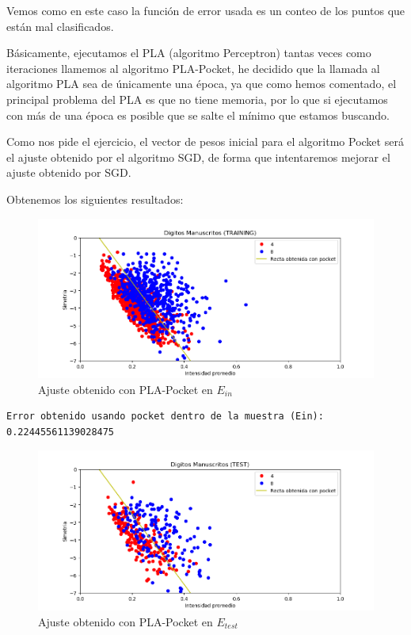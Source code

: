 \documentclass[12pt, spanish]{article}
\begin{document}
Vemos como en este caso la función de error usada es un conteo de los puntos que están mal clasificados.

Básicamente, ejecutamos el PLA (algoritmo Perceptron) tantas veces como iteraciones llamemos al algoritmo PLA-Pocket, he decidido que la llamada al algoritmo PLA sea de únicamente una época, ya que como hemos comentado, el principal problema del PLA es que no tiene memoria, por lo que si ejecutamos con más de una época es posible que se salte el mínimo que estamos buscando.

Como nos pide el ejercicio, el vector de pesos inicial para el algoritmo Pocket será el ajuste obtenido por el algoritmo SGD, de forma que intentaremos mejorar el ajuste obtenido por SGD.

Obtenemos los siguientes resultados:

\begin{figure}[H]
  \centering
      \includegraphics[scale = 0.70]{bonus_pocket.png}
 		 \caption{Ajuste obtenido con PLA-Pocket en $E_{in}$}
  		\label{fig:bonus-pla-pocket}

\end{figure}

\begin{lstlisting}
Error obtenido usando pocket dentro de la muestra (Ein):  0.22445561139028475
\end{lstlisting}

\begin{figure}[H]
  \centering
      \includegraphics[scale = 0.70]{bonus_pocket-test.png}
 		 \caption{Ajuste obtenido con PLA-Pocket en $E_{test}$}
  		\label{fig:bonus-pla-pocket}

\end{figure}
\end{document}
